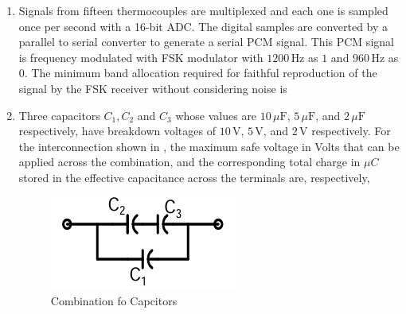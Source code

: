 \documentclass[journal,12pt,onecolumn]{IEEEtran}
\theoremstyle{remark}
\begin{document}
\begin{enumerate}
\item Signals from fifteen thermocouples are multiplexed and each one is sampled once per second with a 16-bit ADC. The digital samples are converted by a parallel to serial converter to generate a serial PCM signal. This PCM signal is frequency modulated with FSK modulator with $1200\,\text{Hz}$ as $1$ and $960\,\text{Hz}$ as $0$. The minimum band allocation required for faithful reproduction of the signal by the FSK receiver without considering noise is  
\par \hfill{}
\begin{enumerate}
\end{enumerate}

\item Three capacitors $C_1, C_2$ and $C_3$ whose values are $10\,\mu\text{F}$, $5\,\mu\text{F}$, and $2\,\mu\text{F}$ respectively, have breakdown voltages of $10\,\text{V}$, $5\,\text{V}$, and $2\,\text{V}$ respectively. For the interconnection shown in , the maximum safe voltage in Volts that can be applied across the combination, and the corresponding total charge in $\mu C$ stored in the effective capacitance across the terminals are, respectively,  
\par \hfill{}
\begin{figure}[H]
\centering
\includegraphics[width=0.3\columnwidth]{Figs/Q-36.png}
\caption{Combination fo Capcitors}
\label{36}
\end{figure}
\begin{enumerate}
\end{enumerate}


\end{enumerate}
\end{document}

